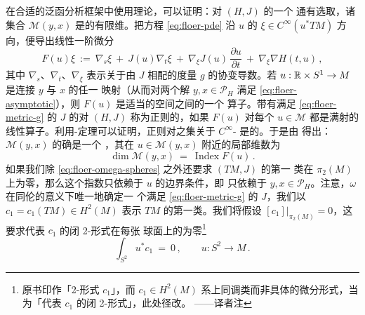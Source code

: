 在合适的泛函分析框架中使用\trFredholm{}理论，可以证明：对 $(H,J)$ 的一个%
通有选取，诸集合 $\mathcal{M}(y,x)$ 是\trSmooth{}的有限维\trManifold。把方程%
\eqref{eq:floer-pde} 沿 $u$ 的\trVectorField{} $\xi\in C^{\infty}(u^{*}TM)$%
方向\trLinearization，便导出线性一阶微分\trOperator
\begin{equation}\label{eq:floer-linearized-F}
F(u)\xi\ :=\ \nabla_{s}\xi\ +\ J(u)\nabla_{t}\xi\ +\ \nabla_{\xi}J(u)\,\frac{\partial u}{\partial t}\ +\ \nabla_{\xi}\nabla H(t,u)\,,
\end{equation}
其中 $\nabla_{s}$、$\nabla_{t}$、$\nabla_{\xi}$ 表示关于由 $J$ 相配的度量 $g$%
的协变导数。若 $u:\mathbb{R}\times S^{1}\to M$ 是连接 $y$ 与 $x$ 的任一\trSmooth{}%
映射（从而对两个\trNondegenerate{}解 $y,x\in\mathcal{P}_{H}$ 满足%
\eqref{eq:floer-asymptotic}），则 $F(u)$ 是适当的\trSobolev{}空间之间的一个%
\trFredholm{}算子。带有满足 \eqref{eq:floer-metric-g} 的%
\trAlmostComplexStructure{} $J$ 的对 $(H,J)$ 称为正则的，如果 $F(u)$ 对每个%
$u\in\mathcal{M}$ 都是满射的线性算子。利用\trSard-\trSmale{}定理可以证明，正则对之集关于 $C^{\infty}$-\trTopology{}%
是\trDense{}的。于是由%
\trImplicitFunctionTheorem{}得出：$\mathcal{M}(y,x)$ 的确是一个\trSmooth{}%
\trManifold，其在 $u\in\mathcal{M}(y,x)$ 附近的局部维数为
\begin{equation}\label{eq:floer-dim-myx}
\dim\mathcal{M}(y,x)\ =\ \operatorname{Index}F(u)\,.
\end{equation}
如果我们除 \eqref{eq:floer-omega-spheres} 之外还要求 $(TM,J)$ 的第一%
\trChern{}类在 $\pi_{2}(M)$ 上为零，那么这个指数只依赖于 $u$ 的边界条件，即%
只依赖于 $y,x\in\mathcal{P}_{H}$。注意，$\omega$ 在同伦的意义下唯一地确定一%
个满足 \eqref{eq:floer-metric-g} 的\trAlmostComplexStructure{} $J$，我们以%
$c_{1}=c_{1}(TM)\in H^{2}(M)$ 表示 $TM$ 的第一\trChern{}类。我们将假设%
$[c_{1}]\big|_{\pi_{2}(M)}=0$，这要求代表 $c_{1}$ 的闭 2-形式在每张%
球面上的\trIntegral{}为零\footnote{原书印作「2-形式 $c_{1}$」，而 $c_{1}\in H^{2}(M)$%
 系上同调类而非具体的微分形式，当为「代表 $c_{1}$ 的闭 2-形式」，此处径改。%
——译者注}
\begin{equation}\label{eq:floer-c1-spheres}
\int_{S^{2}}u^{*}c_{1}\ =\ 0\,,\qquad u:S^{2}\to M\,.
\end{equation}

